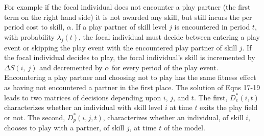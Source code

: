 \documentclass[12pt, letterpaper, fleqn]{article}
\begin{document}
	For example if the focal individual does not encounter a play partner (the first term on the right hand side) it is not awarded any skill, but still incurs the per period cost to skill, $\alpha$. 
	If a play partner of skill level $j$ is encountered in period $t$, with probability $\lambda_j(t)$, the focal individual must decide between entering a play event or skipping the play event with the encountered play partner of skill $j$. 
	If the focal individual decides to play, the focal individual's skill is incremented by $\Delta S(i,~j)$ and decremented by $\alpha$ for every period of the play event.  
	Encountering a play partner and choosing not to play has the same fitness effect as having not encountered a partner in the first place.
	The solution of Eqns 17-19 leads to two matrices of decisions depending upon $i$, $j$, and $t$. 
	The first, $D_e^*(i,t)$ characterizes whether an individual with skill level $i$ at time $t$ exits the play field or not. 
	The second,  $D_p^*(i,j,t)$, characterizes whether an individual, of skill $i$, chooses to play with a partner, of skill $j$, at time $t$ of the model.\\
	
\end{document}
